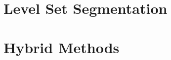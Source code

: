\clearpage

\section{Level Set Segmentation}
\label{sec:LevelSetsSegmentation}
\ifitkFullVersion 

\fi


\section{Hybrid Methods} 
\label{sec:HybridSegmentationMethods}

\ifitkFullVersion 
%
\fi




